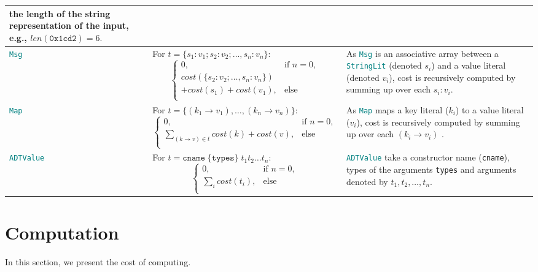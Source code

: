 \documentclass[9pt]{article}
\begin{document}
\begin{table}[!hbt]
\begin{tabular}{|p{2.0cm}|p{6.5cm}|p{6cm}|}
		the length of the string representation of the input, e.g.,
		$len(\texttt{0x1cd2}) = 6.$ \\ \hline
		\texttt{\textcolor{teal}{Msg}} 
		& For $t = \{s_1 : v_1; s_2 : v_2;
		\ldots, s_n : v_n\}$:
		$$ \begin{cases}
    		0, & \text{if } n = 0,  \\
    cost(\{s_2 : v_2; \ldots, s_n : v_n\}) \\
    		 + cost(s_1) + cost(v_1), & 
    		\text{else } \\
  \end{cases}
		$$ & As \texttt{\textcolor{teal}{Msg}} is an associative array
		between a  \texttt{\textcolor{teal}{StringLit}} (denoted $s_i$) and a
		value literal (denoted $v_i$), cost
		is recursively computed by summing up over each $s_i : v_i$.   \\ \hline
		\texttt{\textcolor{teal}{Map}} &
		For $t = \{(k_1 \rightarrow v_1), 
		\ldots, (k_n \rightarrow v_n)\}$:
		$$ \begin{cases}
    		0, & \text{if } n = 0,  \\
  			\sum_{(k \rightarrow v) \in t} {cost(k) + cost(v)},  &
    		\text{else } \\
  \end{cases}
		$$ & As \texttt{\textcolor{teal}{Map}} maps a key literal ($k_i$) to a
		value literal ($v_i$),  cost
		is recursively computed by summing up over each $(k_i \rightarrow v_i)$ . \\ \hline
		\texttt{\textcolor{teal}{ADTValue}} & For $t = \texttt{cname}\;
		\{\texttt{types}\} \; t_1 t_2 \ldots t_n $:
		$$ \begin{cases}
    		0, & \text{if } n = 0,  \\
  			\sum_{i} {cost(t_i)},  &
    		\text{else } \\
  		\end{cases}
		$$ 
		
		& \texttt{\textcolor{teal}{ADTValue}} take a constructor name
		(\texttt{cname}), types of the arguments \texttt{types} and arguments
		denoted by $t_1, t_2, \ldots, t_n$.  \\ \hline
	\end{tabular}
	\end{table}
 
\section{Computation}

In this section, we present the cost of computing.
\end{document}
